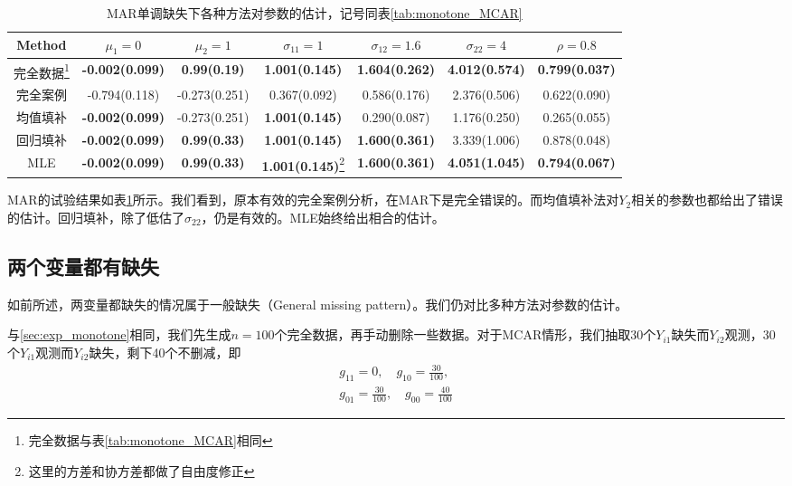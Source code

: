 \documentclass[aps,pre,12pt,preprint,onecolumn,showpacs,showkeys,AutoFakeBold]{revtex4-1}
\begin{document}
\begin{table}[h]
    \caption{\label{tab:monotone_MAR}%
    MAR单调缺失下各种方法对参数的估计，记号同表\ref{tab:monotone_MCAR}}
    \begin{tabular}{|c|c|c|c|c|c|c|}
        \hline
        Method&$\mu _1=0$ &$\mu _2=1$&$\sigma _{11}=1$&$\sigma _{12}=1.6$&$\sigma _{22}=4$&$\rho=0.8$\\\hline
        完全数据\footnote{完全数据与表\ref{tab:monotone_MCAR}相同}&\textbf{-0.002(0.099)}&\textbf{0.99(0.19)}&\textbf{1.001(0.145)}&\textbf{1.604(0.262)}&\textbf{4.012(0.574)}&\textbf{0.799(0.037)}\\\hline
        完全案例&-0.794(0.118)&-0.273(0.251)&0.367(0.092)&0.586(0.176)&2.376(0.506)&0.622(0.090)\\\hline
        均值填补&\textbf{-0.002(0.099)}&-0.273(0.251)&\textbf{1.001(0.145)}&0.290(0.087)&1.176(0.250)&0.265(0.055)\\\hline
        回归填补&\textbf{-0.002(0.099)}&\textbf{0.99(0.33)}&\textbf{1.001(0.145)}&\textbf{1.600(0.361)}&3.339(1.006)&0.878(0.048)\\\hline
        MLE&\textbf{-0.002(0.099)}&\textbf{0.99(0.33)}&\textbf{1.001(0.145)}\footnote{这里的方差和协方差都做了自由度修正}&\textbf{1.600(0.361)}&\textbf{4.051(1.045)}&\textbf{0.794(0.067)}\\\hline
    \end{tabular}
\end{table}
    
MAR的试验结果如表\ref{tab:monotone_MAR}所示。我们看到，原本有效的完全案例分析，在MAR下是完全错误的。而均值填补法对$Y_2$相关的参数也都给出了错误的估计。回归填补，除了低估了$\sigma _{22}$，仍是有效的。MLE始终给出相合的估计。



\subsection{两个变量都有缺失}
如前所述，两变量都缺失的情况属于一般缺失（General missing pattern）。我们仍对比多种方法对参数的估计。

与\ref{sec:exp_monotone}相同，我们先生成$n=100$个完全数据，再手动删除一些数据。对于MCAR情形，我们抽取30个$Y_{i1}$缺失而$Y_{i2}$观测，30个$Y_{i1}$观测而$Y_{i2}$缺失，剩下40个不删减，即
\begin{eqnarray}
    g_{11}=0,\quad g_{10}=\frac{30}{100}, \nonumber \\
    g_{01}=\frac{30}{100},\quad g_{00}=\frac{40}{100}
\end{eqnarray}
\end{document}
